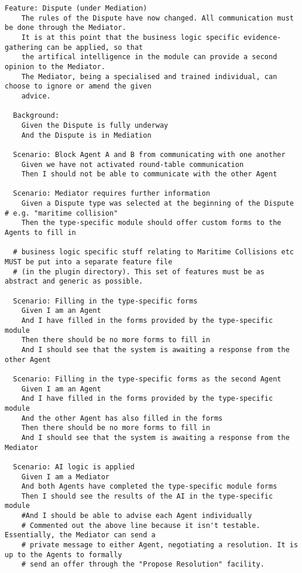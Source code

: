\begin{lstlisting}
Feature: Dispute (under Mediation)
    The rules of the Dispute have now changed. All communication must be done through the Mediator.
    It is at this point that the business logic specific evidence-gathering can be applied, so that
    the artifical intelligence in the module can provide a second opinion to the Mediator.
    The Mediator, being a specialised and trained individual, can choose to ignore or amend the given
    advice.
  
  Background:
    Given the Dispute is fully underway
    And the Dispute is in Mediation

  Scenario: Block Agent A and B from communicating with one another
    Given we have not activated round-table communication
    Then I should not be able to communicate with the other Agent

  Scenario: Mediator requires further information
    Given a Dispute type was selected at the beginning of the Dispute # e.g. "maritime collision"
    Then the type-specific module should offer custom forms to the Agents to fill in

  # business logic specific stuff relating to Maritime Collisions etc MUST be put into a separate feature file
  # (in the plugin directory). This set of features must be as abstract and generic as possible.

  Scenario: Filling in the type-specific forms
    Given I am an Agent
    And I have filled in the forms provided by the type-specific module
    Then there should be no more forms to fill in
    And I should see that the system is awaiting a response from the other Agent

  Scenario: Filling in the type-specific forms as the second Agent
    Given I am an Agent
    And I have filled in the forms provided by the type-specific module
    And the other Agent has also filled in the forms
    Then there should be no more forms to fill in
    And I should see that the system is awaiting a response from the Mediator

  Scenario: AI logic is applied
    Given I am a Mediator
    And both Agents have completed the type-specific module forms
    Then I should see the results of the AI in the type-specific module
    #And I should be able to advise each Agent individually
    # Commented out the above line because it isn't testable. Essentially, the Mediator can send a
    # private message to either Agent, negotiating a resolution. It is up to the Agents to formally
    # send an offer through the "Propose Resolution" facility.


\end{lstlisting}
